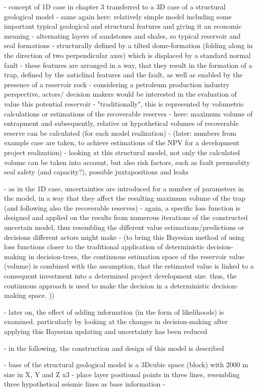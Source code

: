 		- concept of 1D case in chapter 3 transferred to a 3D case of a structural geological model
		- same again here: relatively simple model including some important typical geological and structural features and giving it an economic meaning
		- alternating layers of sandstones and shales, so typical reservoir and seal formations
		- structurally defined by a tilted dome-formation (folding along in the direction of two perpendicular axes) which is displaced by a standard normal fault
		- these features are arranged in a way, that they result in the formation of a trap, defined by the anticlinal features and the fault, as well as enabled by the presence of a reservoir rock
		- considering a petroleum production industry perspective, actors/ decision makers would be interested in the evaluation of value this potential reservoir
		- "traditionally", this is represented by volumetric calculations or estimations of the recoverable reserves
		- here: maximum volume of entrapment and subsequently, relative or hypothetical volumes of recoverable reserve can be calculated (for each model realization)
		- (later: numbers from example case are taken, to achieve estimations of the NPV for a development project realization)
		- looking at this structural model, not only the calculated volume can be taken into account, but also risk factors, such as fault permeabity seal safety (and capacity?), possible juxtapositions and leaks
		
		- as in the 1D case, uncertainties are introduced for a number of parameters in the model, in a way that they affect the resulting maximum volume of the trap (and following also the recoverable reserves)
		- again, a specific loss function is designed and applied on the results from numerous iterations of the constructed uncertain model, thus resembling the different value estimations/predictions or decisions different actors might make
		- (to bring this Bayesian method of using loss functions closer to the traditional application of deterministic decision-making in decision-trees, the continuous estimation space of the reservoir value (volume) is combined with the assumption, that the estimated value is linked to a consequent investment into a determined project development size. thus, the continuous approach is used to make the decision in a deterministic decision-making space. ))
		
		- later on,  the effect of adding information (in the form of likelihoods) is examined, particularly by looking at the changes in decision-making after applying this Bayesian updating and uncertainty has been reduced
		
		- in the following, the construction and design of this model is described
		
		- base of the structural geological model is a 3Dcubic  space (block)  with 2000 m size in X, Y and Z x3
		- place layer positional points in three lines, resembling three hypothetical seismic lines as base information
		-  
